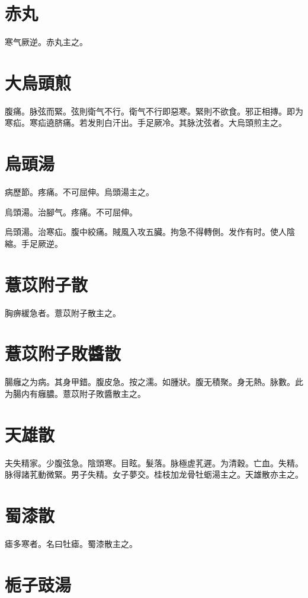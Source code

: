 \documentclass[b5paper,twoside,zihao=-4,UTF8]{ctexbook}
\begin{document}
\section{赤丸}

寒气厥逆。赤丸主之。

\section{大烏頭煎}

腹痛。脉弦而緊。弦則衛气不行。{衛气不行}即惡寒。緊則不欲食。邪正相摶。即为寒疝。寒疝遶脐痛。若发則白汗出。手足厥冷。其脉沈弦者。大烏頭煎主之。

\section{烏頭湯}

病歷節。疼痛。不可屈伸。烏頭湯主之。

烏頭湯。治腳气。疼痛。不可屈伸。

烏頭湯。治寒疝。腹中絞痛。賊風入攻五臟。拘急不得轉側。发作有时。使人陰縮。手足厥逆。

\section{薏苡附子散}

胸痹緩急者。薏苡附子散主之。

\section{薏苡附子敗醬散}

腸癰之为病。其身甲錯。腹皮急。按之濡。如腫狀。腹无積聚。身无熱。脉數。此为腸内有癰膿。薏苡附子敗醬散主之。

\section{天雄散}

夫失精家。少腹弦急。陰頭寒。目眩。髮落。脉極虗芤遲。为清穀。亡血。失精。脉得諸芤動微緊。男子失精。女子夢交。桂枝加龙骨牡蛎湯主之。天雄散亦主之。

\section{蜀漆散}

瘧多寒者。名曰牡瘧。蜀漆散主之。

\section{栀子豉湯}
\end{document}
